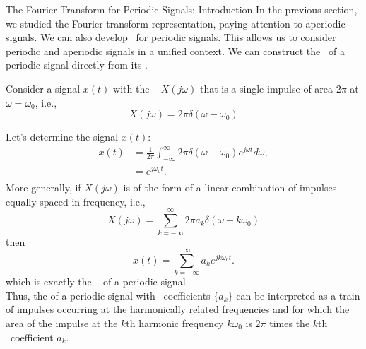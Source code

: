 \begin{frame}{The Fourier Transform for Periodic Signals: Introduction}
    In the previous section, we studied the Fourier transform representation, paying attention to aperiodic signals. We can also develop \ftrs~for periodic signals. This allows us to consider periodic and aperiodic signals in a unified context. We can construct the \ft~of a periodic signal directly from its \fsr .

    Consider a signal $x(t)$  with the \ft~ $X(j\omega)$ that is a single impulse of area $2\pi$ at $\omega=\omega_0$, i.e.,
{
    \begin{equation}
        X(j\omega) = 2\pi \delta(\omega-\omega_0)
    \end{equation}
}


\end{frame}

\begin{frame}
    Let's determine the signal $x(t)$:
    \pause
    {
        \begin{equation*}
            \begin{split}
                x(t) &= \frac{1}{2\pi}\int_{-\infty}^{\infty} 2\pi \delta(\omega-\omega_0)e^{j\omega t} d\omega,\\
                &= e^{j\omega_0 t}.\\
            \end{split}
        \end{equation*}
        \pause
        More generally, if $X(j\omega)$ is of the form of a linear combination of impulses equally spaced in frequency, i.e.,
        \begin{equation}
             X(j\omega) = \sum_{k=-\infty}^{\infty}2\pi a_k \delta(\omega-k\omega_0)
        \end{equation}
        \pause
        then
        \begin{equation}
            x(t) = \sum_{k=-\infty}^{\infty}a_ke^{jk\omega_0 t}.
        \end{equation}
        which is exactly the \fsr~ of a periodic signal. \\
        Thus, the \ft of a periodic signal with \fs~coefficients $\{a_k\}$ can be interpreted as a train of impulses occurring at the harmonically related frequencies and for which the area of the impulse at the $k$th harmonic frequency $k\omega_0$ is $2\pi$ times the $k$th \fs~coefficient $a_k$.
    }

\end{frame}


